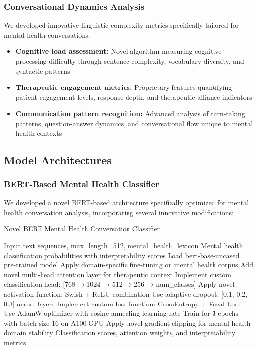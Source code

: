 \documentclass[11pt,twocolumn]{article}
\begin{document}
\subsubsection{Conversational Dynamics Analysis}
We developed innovative linguistic complexity metrics specifically tailored for mental health conversations:
\begin{itemize}
\item \textbf{Cognitive load assessment:} Novel algorithm measuring cognitive processing difficulty through sentence complexity, vocabulary diversity, and syntactic patterns
\item \textbf{Therapeutic engagement metrics:} Proprietary features quantifying patient engagement levels, response depth, and therapeutic alliance indicators
\item \textbf{Communication pattern recognition:} Advanced analysis of turn-taking patterns, question-answer dynamics, and conversational flow unique to mental health contexts
\end{itemize}

\subsection{Model Architectures}

\subsubsection{BERT-Based Mental Health Classifier}

We developed a novel BERT-based architecture specifically optimized for mental health conversation analysis, incorporating several innovative modifications:

\begin{algorithm}[h]
\caption{Novel BERT Mental Health Conversation Classifier}
\begin{algorithmic}[1]
\REQUIRE Input text sequences, max\_length=512, mental\_health\_lexicon
\ENSURE Mental health classification probabilities with interpretability scores
\STATE Load bert-base-uncased pre-trained model
\STATE Apply domain-specific fine-tuning on mental health corpus
\STATE Add novel multi-head attention layer for therapeutic context
\STATE Implement custom classification head: [768 → 1024 → 512 → 256 → num\_classes]
\STATE Apply novel activation function: Swish + ReLU combination
\STATE Use adaptive dropout: [0.1, 0.2, 0.3] across layers
\STATE Implement custom loss function: CrossEntropy + Focal Loss
\STATE Use AdamW optimizer with cosine annealing learning rate
\STATE Train for 3 epochs with batch size 16 on A100 GPU
\STATE Apply novel gradient clipping for mental health domain stability
\RETURN Classification scores, attention weights, and interpretability metrics
\end{algorithmic}
\end{algorithm}
\end{document}
